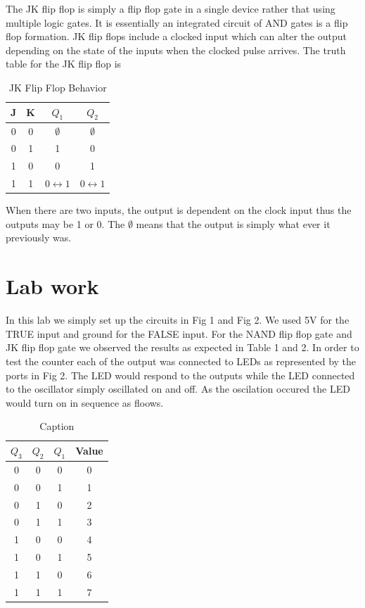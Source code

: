 \documentclass[11pt,letterpaper,onecolumn]{article}
\begin{document}
The JK flip flop is simply a flip flop gate in a single device rather that using multiple logic gates. It is essentially an integrated circuit of AND gates is a flip flop formation. JK flip flops include a clocked input which can alter the output depending on the state of the inputs when the clocked pulse arrives. The truth table for the JK flip flop is 

 \begin{table}[H]
\centering
\begin{tabular}{|c|c|c|c|}
 \hline
 J & K & $Q_1$ & $Q_2$ \\\hline
 0 & 0 & $\emptyset$ & $\emptyset$\\
 0 & 1 & 1 & 0 \\
 1 & 0 & 0 & 1 \\
 1 & 1 & $0\leftrightarrow 1$ & $0\leftrightarrow1$ \\
  \hline
\end{tabular}
\caption{JK Flip Flop Behavior}
\label{tab:JKff}
\end{table}
 
When there are two inputs, the output is dependent on the clock input thus the outputs may be 1 or 0. The $\emptyset$ means that the output is simply what ever it previously was.

\section{Lab work}

In this lab we simply set up the circuits in Fig 1 and Fig 2. We used 5V for the TRUE input and ground for the FALSE input. For the NAND flip flop gate and JK flip flop gate we observed the results as expected in Table 1 and 2. In order to test the counter each of the output was connected to LEDs as represented by the ports in Fig 2. The LED would respond to the outputs while the LED connected to the oscillator simply oscillated on and off. As the oscilation occured the LED would turn on in sequence as floows.
\begin{table}[]
    \centering
    \begin{tabular}{|c|c|c|c|}
   \hline
 $Q_3$ & $Q_2$ & $Q_1$ & Value\\ \hline
  0 & 0 & 0 & 0\\
  0 & 0 & 1 & 1\\
  0 & 1 & 0 & 2\\
  0 & 1 & 1 & 3\\
  1 & 0 & 0 & 4\\
  1 & 0 & 1 & 5\\
  1 & 1 & 0 & 6\\
  1 & 1 & 1 & 7\\
       
    \hline
    \end{tabular}
    \caption{Caption}
    \label{tab:my_label}
\end{table}
\end{document}
